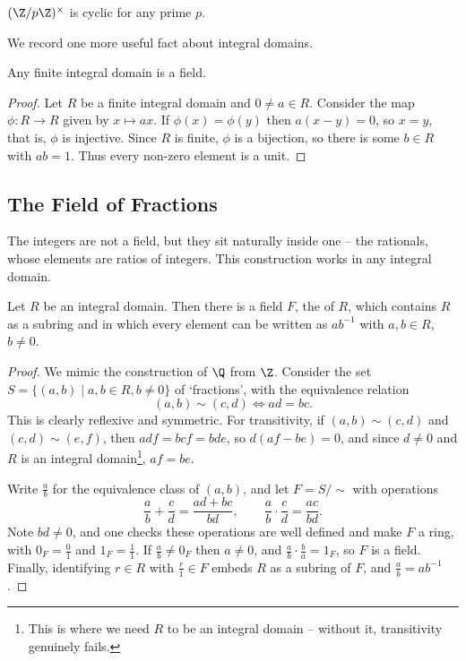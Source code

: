 \begin{corollary}
	$(\Z/p\Z)^\times$ is cyclic for any prime $p$.
\end{corollary}

We record one more useful fact about integral domains.

\begin{proposition}
	Any finite integral domain is a field.
\end{proposition}
\begin{proof}
	Let $R$ be a finite integral domain and $0 \neq a \in R$. Consider the map $\phi: R \rightarrow R$ given by $x \mapsto ax$. If $\phi(x) = \phi(y)$ then $a(x - y) = 0$, so $x = y$, that is, $\phi$ is injective. Since $R$ is finite, $\phi$ is a bijection, so there is some $b \in R$ with $ab = 1$. Thus every non-zero element is a unit.
\end{proof}

\subsection{The Field of Fractions}

The integers are not a field, but they sit naturally inside one -- the rationals, whose elements are ratios of integers. This construction works in any integral domain.

\begin{theorem}
	Let $R$ be an integral domain. Then there is a field $F$, the  of $R$, which contains $R$ as a subring and in which every element can be written as $a b^{-1}$ with $a, b \in R$, $b \neq 0$.
\end{theorem}
\begin{proof}
	We mimic the construction of $\Q$ from $\Z$. Consider the set $S = \{(a, b) \mid a, b \in R, b \neq 0\}$ of `fractions', with the equivalence relation
	$$
	(a, b) \sim (c, d) \iff ad = bc.
	$$
	This is clearly reflexive and symmetric. For transitivity, if $(a,b) \sim (c,d)$ and $(c, d) \sim (e, f)$, then $adf = bcf = bde$, so $d(af - be) = 0$, and since $d \neq 0$ and $R$ is an integral domain\footnote{This is where we need $R$ to be an integral domain -- without it, transitivity genuinely fails.}, $af = be$.

	Write $\frac{a}{b}$ for the equivalence class of $(a, b)$, and let $F = S/{\sim}$ with operations
	$$
	\frac{a}{b} + \frac{c}{d} = \frac{ad + bc}{bd}, \qquad \frac{a}{b}\cdot \frac{c}{d} = \frac{ac}{bd}.
	$$
	Note $bd \neq 0$, and one checks these operations are well defined and make $F$ a ring, with $0_F = \frac{0}{1}$ and $1_F = \frac{1}{1}$. If $\frac{a}{b} \neq 0_F$ then $a \neq 0$, and $\frac{a}{b} \cdot \frac{b}{a} = 1_F$, so $F$ is a field. Finally, identifying $r \in R$ with $\frac{r}{1} \in F$ embeds $R$ as a subring of $F$, and $\frac{a}{b} = a b^{-1}$.
\end{proof}

